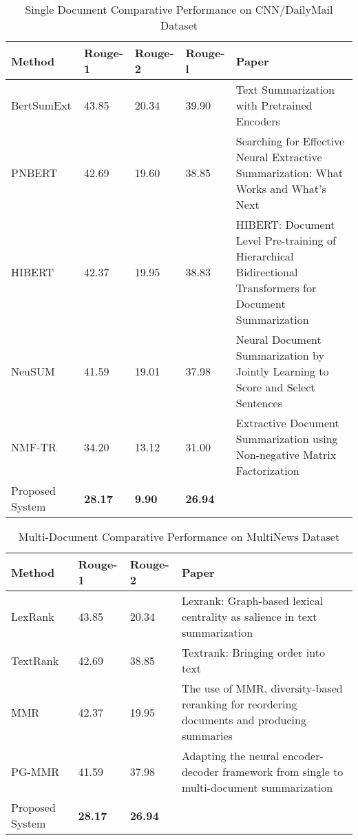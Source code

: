 \begin{table}[h]
    \caption{Single Document Comparative Performance on CNN/DailyMail Dataset}
    \label{tab:singleCompare}
    \centering
    \begin{tabular}{| L | l | l | l | L |}\hline
    \textbf{Method} & \textbf{Rouge-1} & \textbf{Rouge-2} & \textbf{Rouge-l} & \textbf{Paper} \Tstrut\Bstrut\\\hline
    BertSumExt \citep{liu2019text} & 43.85 & 20.34 & 39.90 & Text Summarization with Pretrained Encoders \Tstrut\Bstrut\\\hline
    PNBERT \citep{zhong2019searching} & 42.69 & 19.60 & 38.85 & Searching for Effective Neural Extractive Summarization: What Works and What’s Next \Tstrut\Bstrut\\\hline
    HIBERT \citep{zhang2019hibert} & 42.37 & 19.95 & 38.83 & HIBERT: Document Level Pre-training of Hierarchical Bidirectional Transformers for Document Summarization \Tstrut\Bstrut\\\hline
    NeuSUM \citep{zhou2018neural} & 41.59 & 19.01 & 37.98 & Neural Document Summarization by Jointly Learning to Score and Select Sentences \Tstrut\Bstrut\\\hline
    NMF-TR \citep{khurana2019extractive} & 34.20 & 13.12 & 31.00  & Extractive Document Summarization using Non-negative Matrix Factorization \Tstrut\Bstrut\\\hline
    Proposed System	& \textbf{28.17} & \textbf{9.90} & \textbf{26.94} & \Tstrut\Bstrut\\\hline
    \end{tabular}
\end{table}

\begin{table}[h]
    \caption{Multi-Document Comparative Performance on MultiNews Dataset}
    \label{tab:multiCompare}
    \centering
    \begin{tabular}{| L | l | l | L |} \hline
    \textbf{Method} & \textbf{Rouge-1} & \textbf{Rouge-2} & \textbf{Paper} \Tstrut\Bstrut\\\hline
    LexRank \citep{erkan2004lexrank} & 43.85 & 20.34  & Lexrank: Graph-based lexical centrality as salience in text summarization \Tstrut\Bstrut\\\hline
    TextRank \citep{mihalcea2004textrank} & 42.69 & 38.85 & Textrank: Bringing order into text \Tstrut\Bstrut\\\hline
    MMR \citep{carbonell1998use} & 42.37 & 19.95  & The use of MMR, diversity-based reranking for reordering documents and producing summaries \Tstrut\Bstrut\\\hline
    PG-MMR \citep{lebanoff2018adapting} & 41.59 & 37.98 & Adapting the neural encoder-decoder framework from single to multi-document summarization \Tstrut\Bstrut\\\hline
    Proposed System	& \textbf{28.17} & \textbf{26.94} & \Tstrut\Bstrut\\\hline
    \end{tabular}
\end{table}

